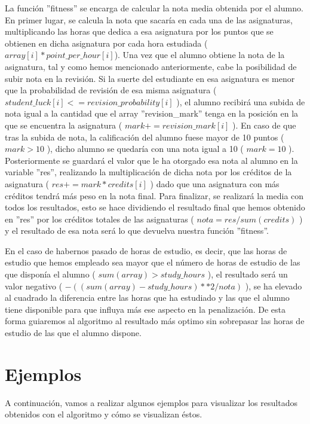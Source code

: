 \documentclass[11pt, a4paper, titlepage]{article}
\begin{document}
\vspace{5mm}

La función ''fitness'' se encarga de calcular la nota media obtenida por el alumno. En primer lugar, se calcula la nota que sacaría en cada una de las asignaturas, multiplicando las horas que dedica a esa asignatura por los puntos que se obtienen en dicha asignatura por cada hora estudiada ($ array[i] * point\_per\_hour[i] $). Una vez que el alumno obtiene la nota de la asignatura, tal y como hemos mencionado anteriormente, cabe la posibilidad de subir nota en la revisión. Si la suerte del estudiante en esa asignatura es menor que la probabilidad de revisión de esa misma asignatura ( $ student\_luck[i] <= revision\_probability[i] $ ), el alumno recibirá una subida de nota igual a la cantidad que el array ''revision\_mark'' tenga en la posición en la que se encuentra la asignatura ( $ mark += revision\_mark[i] $ ). En caso de que tras la subida de nota, la calificación del alumno fuese mayor de 10 puntos ( $ mark > 10 $ ), dicho alumno se quedaría con una nota igual a 10 ( $ mark = 10 $ ). Posteriormente se guardará el valor que le ha otorgado esa nota al alumno en la variable ''res'', realizando la multiplicación de dicha nota por los créditos de la asignatura ( $ res += mark * credits[i] $ ) dado que una asignatura con más créditos tendrá más peso en la nota final. Para finalizar, se realizará la media con todos los resultados, esto se hace dividiendo el resultado final que hemos obtenido en ''res'' por los créditos totales de las asignaturas ( $ nota = res / sum(credits) $ ) y el resultado de esa nota será lo que devuelva nuestra función ''fitness''.

\vspace{5mm}

En el caso de habernos pasado de horas de estudio, es decir, que las horas de estudio que hemos empleado sea mayor que el número de horas de estudio de las que disponía el alumno ( $sum(array) > study\_hours$ ), el resultado será un valor negativo ( $ -((sum(array) - study\_hours) ** 2 / nota)$ ), se ha elevado al cuadrado la diferencia entre las horas que ha estudiado y las que el alumno tiene disponible para que influya más ese aspecto en la penalización. De esta forma guiaremos al algoritmo al resultado más optimo sin sobrepasar las horas de estudio de las que el alumno dispone.



\section{Ejemplos}
A continuación, vamos a realizar algunos ejemplos para visualizar los resultados obtenidos con el algoritmo y cómo se visualizan éstos.
\end{document}
